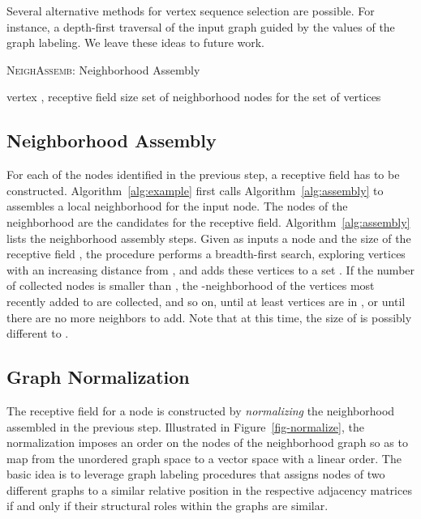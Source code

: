 \documentclass{article}
\begin{document}
Several alternative methods for vertex sequence selection are possible. For instance, a depth-first traversal of the input graph guided by the values of the graph labeling. We leave these ideas to future work.

\begin{algorithm}[t!]
  \small
   \caption{\label{alg:assembly}\textsc{NeighAssemb}: Neighborhood Assembly}   
\begin{algorithmic}[1]
    vertex , receptive field size 
    set of neighborhood nodes  for 
   \STATE 
   \STATE 
   \STATE 
   \STATE 
   \ENDWHILE
    the set of vertices 
\end{algorithmic}
\end{algorithm}
\vspace{-1mm}

\subsection{Neighborhood Assembly}

For each of the nodes identified in the previous step, a receptive field has to be constructed. Algorithm~\ref{alg:example} first calls Algorithm~\ref{alg:assembly} to assembles a local neighborhood for the input node. The nodes of the neighborhood are the candidates for the receptive field. Algorithm~\ref{alg:assembly} lists the neighborhood assembly steps. Given as inputs a node  and the size of the receptive field , the procedure performs a breadth-first search, exploring vertices with an increasing distance from , and adds these vertices to a set . If the number of collected nodes is smaller than , the -neighborhood of the  vertices most recently added to  are collected, and so on, until at least  vertices are in , or until there are no more neighbors to add. Note that at this time, the size of  is possibly different to .






\subsection{Graph Normalization}

The receptive field for a node is constructed by \emph{normalizing} the neighborhood assembled in the previous step. Illustrated in Figure~\ref{fig-normalize}, the normalization imposes an order on the nodes of the neighborhood graph so as to map from the unordered graph space to a vector space with a linear order. The basic idea is to leverage graph labeling procedures that assigns nodes of two different graphs to a similar relative position in the respective adjacency matrices if and only if their structural roles within the graphs are similar.
\end{document}
